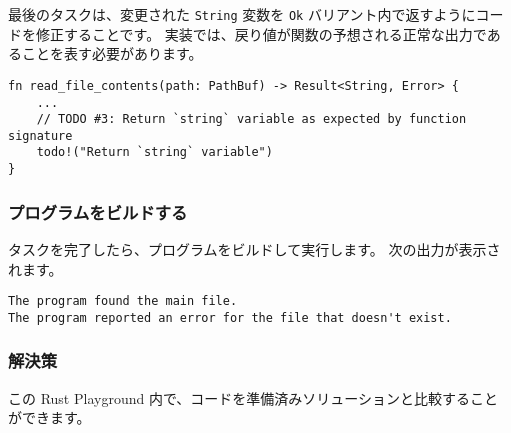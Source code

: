 最後のタスクは、変更された \texttt{String} 変数を \texttt{Ok} バリアント内で返すようにコードを修正することです。 実装では、戻り値が関数の予想される正常な出力であることを表す必要があります。

\begin{lstlisting}[numbers=none]
fn read_file_contents(path: PathBuf) -> Result<String, Error> {
    ...
    // TODO #3: Return `string` variable as expected by function signature
    todo!("Return `string` variable")
}
\end{lstlisting}

\subsubsection{プログラムをビルドする}

タスクを完了したら、プログラムをビルドして実行します。 次の出力が表示されます。

\begin{lstlisting}[numbers=none]
The program found the main file.
The program reported an error for the file that doesn't exist.
\end{lstlisting}

\subsubsection{解決策}

この Rust Playground 内で、コードを準備済みソリューションと比較することができます。

